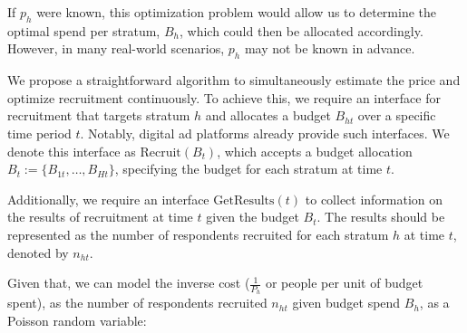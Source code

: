 
If $p_h$  were known, this optimization problem would allow us to determine the optimal spend per stratum, $B_h$, which could then be allocated accordingly. However, in many real-world scenarios, $p_h$ may not be known in advance.
  
We propose a straightforward algorithm to simultaneously estimate the price and optimize recruitment continuously. To achieve this, we require an interface for recruitment that targets stratum \( h \) and allocates a budget \( B_{ht} \) over a specific time period \( t \). Notably, digital ad platforms already provide such interfaces. We denote this interface as \(\text{Recruit}(B_t)\), which accepts a budget allocation \( B_t := \{B_{1t}, \ldots, B_{Ht}\} \), specifying the budget for each stratum at time \( t \).

Additionally, we require an interface \(\text{GetResults}(t)\) to collect information on the results of recruitment at time \( t \) given the budget \( B_t \). The results should be represented as the number of respondents recruited for each stratum \( h \) at time \( t \), denoted by \( n_{ht} \).


Given that, we can model the inverse cost ($\frac{1}{P_h}$ or people per unit of budget spent),  as the number of respondents recruited $n_{ht}$ given budget spend $B_h$, as a Poisson random variable:

